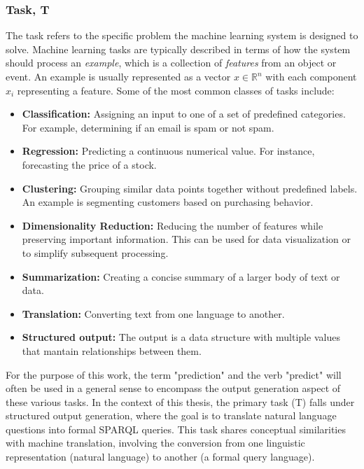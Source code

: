 \subsubsection{Task, T}
The task refers to the specific problem the machine learning system is designed to solve.
Machine learning tasks are typically described in terms of how the system should process an \textit{example}, which is a collection of \textit{features} from an object or event. 
An example is usually represented as a vector $x \in \mathbb{R}^n$ with each component $x_i$ representing a feature.
Some of the most common classes of tasks include:
\begin{itemize}
    \item \textbf{Classification:} Assigning an input to one of a set of predefined categories. For example, determining if an email is spam or not spam.
    \item \textbf{Regression:} Predicting a continuous numerical value. For instance, forecasting the price of a stock.
    \item \textbf{Clustering:} Grouping similar data points together without predefined labels. An example is segmenting customers based on purchasing behavior.
    \item \textbf{Dimensionality Reduction:} Reducing the number of features while preserving important information. This can be used for data visualization or to simplify subsequent processing.
    \item \textbf{Summarization:} Creating a concise summary of a larger body of text or data.
    \item \textbf{Translation:} Converting text from one language to another.
    \item \textbf{Structured output:} The output is a data structure with multiple values that mantain relationships between them.
\end{itemize}
For the purpose of this work, the term "prediction" and the verb "predict" will often be used in a general sense to encompass the output generation aspect of these various tasks.
In the context of this thesis, the primary task (T) falls under structured output generation, where the goal is to translate natural language questions into formal SPARQL queries. 
This task shares conceptual similarities with machine translation, involving the conversion from one linguistic representation (natural language) to another (a formal query language).

